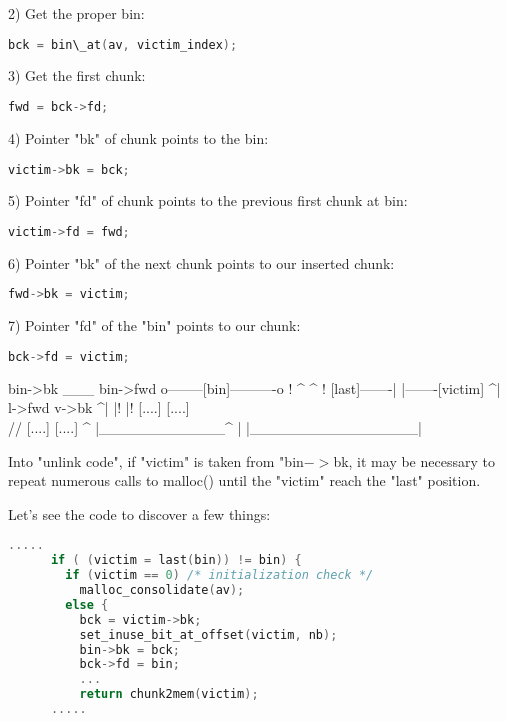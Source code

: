 \documentclass[12pt]{article}
\begin{document}
       2) Get the proper bin:
\begin{lstlisting}[language=C]
             bck = bin\_at(av, victim_index);
\end{lstlisting}

       3) Get the first chunk:
\begin{lstlisting}[language=C]
             fwd = bck->fd;
\end{lstlisting}

       4) Pointer "bk" of chunk points to the bin:
\begin{lstlisting}[language=C]
             victim->bk = bck;
\end{lstlisting}

       5) Pointer "fd" of chunk points to the previous
          first chunk at bin:
\begin{lstlisting}[language=C]
             victim->fd = fwd;
\end{lstlisting}

       6) Pointer "bk" of the next chunk points to our
          inserted chunk:
\begin{lstlisting}[language=C]
             fwd->bk = victim;
\end{lstlisting}

       7) Pointer "fd" of the "bin" points to our chunk:
\begin{lstlisting}[language=C]
             bck->fd = victim;
\end{lstlisting}

\begin{verbnobox}[\small]
                   bin->bk  ___  bin->fwd
                  o--------[bin]----------o
                  !         ^ ^           !
               [last]-------| |-------[victim]
                 ^|   l->fwd    v->bk    ^|
                 |!                      |!
               [....]                  [....]
                   \\                  //
                    [....]        [....]
                     ^ |____________^ |
                     |________________|    
\end{verbnobox}

	
Into "unlink code", if "victim" is taken from "bin$->$bk, it may be
necessary to repeat numerous calls to malloc() until the "victim" reach
the "last" position.
\newline


Let's see the code to discover a few things:


\begin{lstlisting}[language=C]
      .....
      if ( (victim = last(bin)) != bin) {
        if (victim == 0) /* initialization check */
          malloc_consolidate(av);
        else {
          bck = victim->bk;
          set_inuse_bit_at_offset(victim, nb);
          bin->bk = bck;
          bck->fd = bin;
          ...
          return chunk2mem(victim);
      .....
\end{lstlisting}
\end{document}
